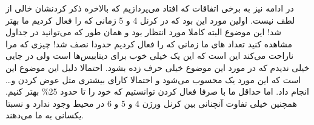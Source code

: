 در ادامه نیز به برخی اتفاقات
که افتاد می‌پردازیم که بالاخره ذکر کردنشان خالی از لطف نیست. اولین مورد این بود که در کرنل 4 و 5
زمانی که
را فعال کردیم
ما بهتر شد! این موضوع البته کاملا مورد انتظار بود و همان طور که می‌توانید در جداول مشاهده
کنید تعداد
های
ما زمانی که
را فعال کردیم حدودا نصف شد! چیزی که مرا ناراحت می‌کند این است که این یک
خیلی خوب برای دیتابیس‌ها است ولی در جایی خیلی ندیدم که در مورد این موضوع خیلی حرف زده بشود.
احتمالا دلیل این موضوع این است که این مورد یک
محسوب می‌شود و احتمالا کارای بیشتری مثل عوض کردن
 و\dots
انجام داد. اما حداقل ما با صرفا فعال کردن
توانستیم که
خود را تا حدود 25\%
بهتر کنیم. همچنین خیلی تفاوت آنچنانی بین کرنل ورژن 4 و 5 و 6 در محیط
وجود ندارد و
نسبتا یکسانی به ما می‌دهند.